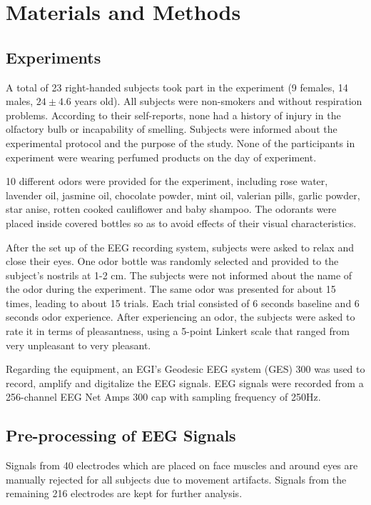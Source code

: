\section{Materials and Methods}

\subsection{Experiments}
A total of 23 right-handed subjects took part in the experiment (9 females, 14 males, $24 \pm 4.6$ years old). All subjects were non-smokers and without respiration problems. According to their self-reports, none had a history of injury in the olfactory bulb or incapability of smelling. Subjects were informed about the experimental protocol and the purpose of the study. None of the participants in experiment were wearing perfumed products on the day of experiment. 

10 different odors were provided for the experiment, including rose water, lavender oil, jasmine oil, chocolate powder, mint oil, valerian pills, garlic powder, star anise, rotten cooked cauliflower and baby shampoo. The odorants were placed inside covered bottles so as to avoid effects of their visual characteristics.

After the set up of the EEG recording system, subjects were asked to relax and close their eyes. One odor bottle was randomly selected and provided to the subject's nostrils at 1-2 cm. The subjects were not informed about the name of the odor during the experiment. The same odor was presented for about 15 times, leading to about 15 trials. Each trial consisted of 6 seconds baseline and 6 seconds odor experience. After experiencing an odor, the subjects were asked to rate it in terms of pleasantness, using a 5-point Linkert scale that ranged from very unpleasant to very pleasant. 

Regarding the equipment, an EGI's Geodesic EEG system (GES) 300 was used to record, amplify and digitalize the EEG signals. EEG signals were recorded from a 256-channel EEG Net Amps 300 cap with sampling frequency of 250Hz.  

\subsection{Pre-processing of EEG Signals}
Signals from 40 electrodes which are placed on face muscles and around eyes are manually rejected for all subjects due to movement artifacts. Signals from the remaining 216 electrodes are kept for further analysis. 

